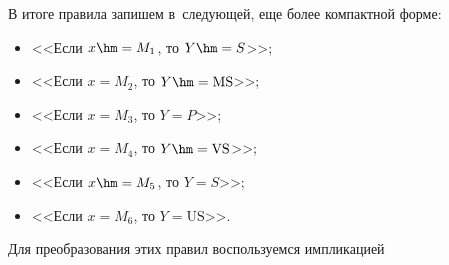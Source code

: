 
  

  В итоге правила запишем в~следующей, еще более компактной форме:

\begin{itemize}  

\item[$e_1$:] <<Если $x\hm= M_1$, то $Y \hm= S$>>; 



\item[$e_2$:] <<Если $ x = M_2$, то $Y\hm= $>>;



\item[$e_3$:] <<Если $x = M_3$, то $Y = P$>>;



\item[$e_4$:] <<Если $x = M_4$, то $Y\hm= $>>;



\item[$e_5$:] <<Если $x\hm=M_5$, то $Y = S$>>;



\item[$e_6$:] <<Если $x= M_6$, то $Y = $>>. 

\end{itemize}

  

  Для преобразования этих правил воспользуемся импликацией 


